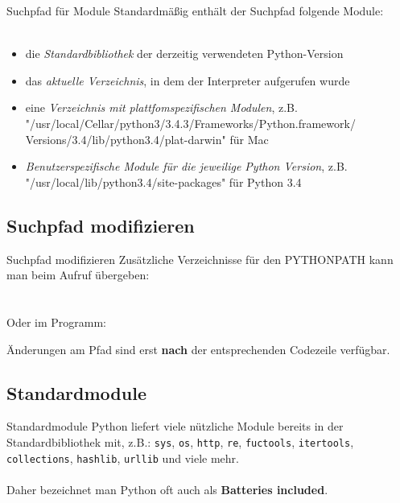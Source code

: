 \begin{frame}{Suchpfad f\"ur Module}
	Standardm\"a\ss{}ig enth\"alt der Suchpfad folgende Module: \\ \ \\
	\begin{itemize}
		\item die \textit{Standardbibliothek} der derzeitig verwendeten Python-Version
		\item das \textit{aktuelle Verzeichnis}, in dem der Interpreter aufgerufen wurde
		\item eine \textit{Verzeichnis mit plattfomspezifischen Modulen}, z.B.
			"/usr/local/Cellar/python3/3.4.3/Frameworks/Python.framework/
			Versions/3.4/lib/python3.4/plat-darwin" f\"ur Mac
		\item \textit{Benutzerspezifische Module f\"ur die jeweilige Python Version}, z.B. "/usr/local/lib/python3.4/site-packages" f\"ur Python 3.4
	\end{itemize}
\end{frame}



\subsection{Suchpfad modifizieren}
\begin{frame}{Suchpfad modifizieren}
	Zus\"atzliche Verzeichnisse f\"ur den PYTHONPATH kann man beim Aufruf \"ubergeben:\\
	\hspace*{.5cm}\\ \ \\
	Oder im Programm:
	
	\"Anderungen am Pfad sind erst \textbf{nach} der entsprechenden Codezeile verf\"ugbar.
\end{frame}



\subsection{Standardmodule}
\begin{frame}{Standardmodule}
	Python liefert viele n\"utzliche Module bereits in der Standardbibliothek mit, z.B.:
	\texttt{sys}, \texttt{os}, \texttt{http}, \texttt{re}, \texttt{fuctools}, \texttt{itertools}, \texttt{collections}, \texttt{hashlib}, \texttt{urllib} und viele mehr. \\ \ \\
	Daher bezeichnet man Python oft auch als \textbf{Batteries included}.
\end{frame}

